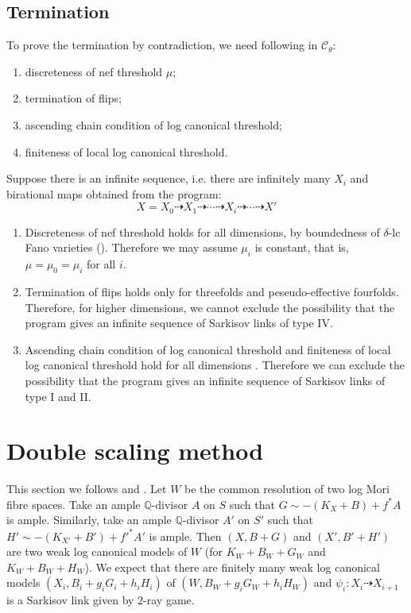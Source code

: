 \documentclass[11pt]{amsart}
\begin{document}
\subsection{Termination}
To prove the termination by contradiction, we need following in $\mathcal{C}_{\theta}$: 
\begin{enumerate}
  \item discreteness of nef threshold $\mu$;
  \item termination of flips;
  \item ascending chain condition of log canonical threshold;
  \item finiteness of local log canonical threshold.
\end{enumerate}
Suppose there is an infinite sequence, i.e. there are infinitely many $ X_i $ and birational maps obtained from the program:
\[ X=X_0\dashrightarrow X_1\dashrightarrow \cdots\dashrightarrow X_i \dashrightarrow\cdots\dashrightarrow X'\]
\begin{enumerate}
  \item Discreteness of nef threshold holds for all dimensions, by boundedness of $\delta$-lc Fano varieties (\cite[Theorem 1.1]{birkarSingularitiesLinearSystems2020}). Therefore we may assume $\mu_{i}$ is constant, that is, $\mu=\mu_{0}=\mu_{i}$ for all $i$.
  \item  Termination of flips holds only for threefolds and peseudo-effective fourfolds.  
    Therefore, for higher dimensions, we cannot exclude the possibility that the program gives an infinite sequence of Sarkisov links of type IV.
  \item Ascending chain condition of log canonical threshold and finiteness of local log canonical threshold hold for all dimensions \cite{HMX14}. Therefore we can exclude the possibility that the program gives an infinite sequence of Sarkisov links of type I and II.

\end{enumerate}

\section{Double scaling method}
This section we follows \cite[\S 13]{haconMinimalModelProgram2012} and  \cite{liuSarkisovProgramGeneralized2021}.
 Let $W$ be the common resolution of two log Mori fibre spaces. Take an ample $\mathbb{Q}$-divisor $A$ on $S$ such that $G\sim -(K_{X}+B) +f^*A$  is ample. Similarly, take an ample $\mathbb{Q}$-divisor $A'$ on $S'$ such that $H'\sim -(K_{X'}+B') +f'^*A'$  is ample. Then  $(X,B+G)$ and $(X',B'+H')$ are two weak log canonical models of $W$ (for $K_{W}+B_{W}+G_{W}$ and $K_{W}+B_{W}+H_{W}$). We expect that there are finitely many weak log canonical models $(X_{i},B_{i}+g_{i}G_{i}+h_{i}H_{i})$ of $(W,B_{W}+g_{i}G_{W}+h_{i}H_{W})$ and $\psi_{i}:X_{i}\dashrightarrow X_{i+1}$ is a Sarkisov link given by $2$-ray game.
\end{document}
